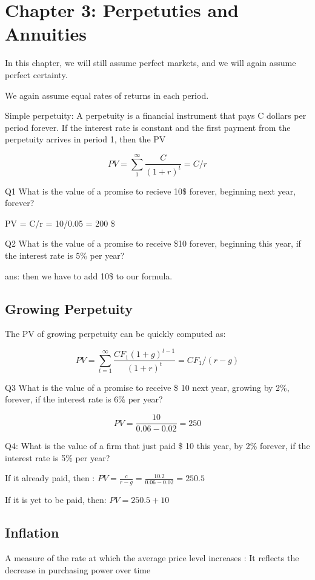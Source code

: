 \section{Chapter 3: Perpetuties and Annuities}

In this chapter, we will still assume perfect markets, and we will again assume perfect certainty.

We again assume equal rates of returns in each period.

Simple perpetuity:
A perpetuity is a financial instrument that pays C dollars per period forever.
If the interest rate is constant and the first payment from the perpetuity arrives in period 1, then the PV 

\[
PV = \sum_{1}^{\infty} \frac{C}{(1 + r)^t} = C/r
\]

Q1 What is the value of a promise to recieve 10\$ forever, beginning next year, forever?

PV = C/r = 10/0.05 = 200 \$

Q2 What is the value of a promise to receive \$10 forever, beginning this year, if the interest rate is 5\% per year?

ans: then we have to add 10\$ to our formula.

\subsection{Growing Perpetuity}

The PV of growing perpetuity can be quickly computed as:

\[
PV = \sum_{t = 1}^{\infty} \frac{CF_1 (1 + g)^{t - 1}}{(1 + r)^t} = CF_1/(r - g)
\]

Q3 What is the value of a promise to receive \$ 10 next year, growing by 2\%, forever, if the interest rate is 6\% per year?

\[
PV = \frac{10}{0.06 - 0.02} = 250
\]

Q4: What is the value of a firm that just paid \$ 10 this year, by 2\% forever, if the interest rate is 5\% per year?

If it already paid, then : $PV = \frac{c}{r - g} = \frac{10.2}{0.06 - 0.02} = 250.5$

If it is yet to be paid, then: $PV = 250.5 + 10$

\subsection{Inflation}
A measure of the rate at which the average price level increases
:
It reflects the decrease in purchasing power over time


